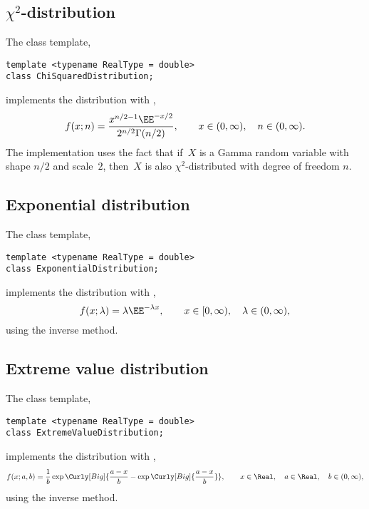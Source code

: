 \subsection{\texorpdfstring{$\chi^2$}{Chi-squared}-distribution}
\label{Chi-squared-distribution}

The class template,
\begin{verbatim}
template <typename RealType = double>
class ChiSquaredDistribution;
\end{verbatim}
implements the distribution with \pdf,
\begin{equation*}
  f(x;n) = \frac{x^{n/2 - 1}\EE^{-x/2}}{2^{n/2}\Gamma(n/2)},\qquad
  x \in (0,\infty),\quad n \in (0,\infty).
\end{equation*}
The implementation uses the fact that if~$X$ is a Gamma random variable with
shape $n / 2$ and scale~$2$, then~$X$ is also $\chi^2$-distributed with degree
of freedom $n$.

\subsection{Exponential distribution}
\label{sub:Exponential distribution}

The class template,
\begin{verbatim}
template <typename RealType = double>
class ExponentialDistribution;
\end{verbatim}
implements the distribution with \pdf,
\begin{equation*}
  f(x;\lambda) = \lambda\EE^{-\lambda x},\qquad
  x \in [0,\infty),\quad \lambda \in (0,\infty),
\end{equation*}
using the inverse method.

\subsection{Extreme value distribution}
\label{sub:Extreme value distribution}

The class template,
\begin{verbatim}
template <typename RealType = double>
class ExtremeValueDistribution;
\end{verbatim}
implements the distribution with \pdf,
\begin{equation*}
  f(x;a,b) =
  \frac{1}{b}\exp\Curly[Big]{
    \frac{a - x}{b} - \exp\Curly[Big]{\frac{a - x}{b}}},\qquad
  x \in \Real,\quad a \in \Real,\quad b \in (0, \infty),
\end{equation*}
using the inverse method.

